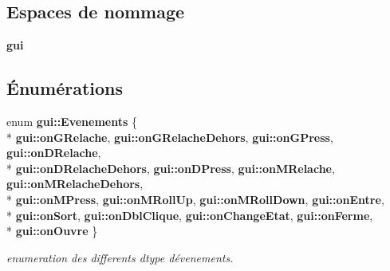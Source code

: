 \subsection*{Espaces de nommage}
\begin{DoxyCompactItemize}
\item 
 {\bf gui}
\end{DoxyCompactItemize}
\subsection*{Énumérations}
\begin{DoxyCompactItemize}
\item 
enum {\bf gui\+::\+Evenements} \{ \\*
{\bf gui\+::on\+G\+Relache}, 
{\bf gui\+::on\+G\+Relache\+Dehors}, 
{\bf gui\+::on\+G\+Press}, 
{\bf gui\+::on\+D\+Relache}, 
\\*
{\bf gui\+::on\+D\+Relache\+Dehors}, 
{\bf gui\+::on\+D\+Press}, 
{\bf gui\+::on\+M\+Relache}, 
{\bf gui\+::on\+M\+Relache\+Dehors}, 
\\*
{\bf gui\+::on\+M\+Press}, 
{\bf gui\+::on\+M\+Roll\+Up}, 
{\bf gui\+::on\+M\+Roll\+Down}, 
{\bf gui\+::on\+Entre}, 
\\*
{\bf gui\+::on\+Sort}, 
{\bf gui\+::on\+Dbl\+Clique}, 
{\bf gui\+::on\+Change\+Etat}, 
{\bf gui\+::on\+Ferme}, 
\\*
{\bf gui\+::on\+Ouvre}
 \}\begin{DoxyCompactList}\small\item\em enumeration des differents dtype d\textquotesingle{}évenements. \end{DoxyCompactList}
\end{DoxyCompactItemize}
